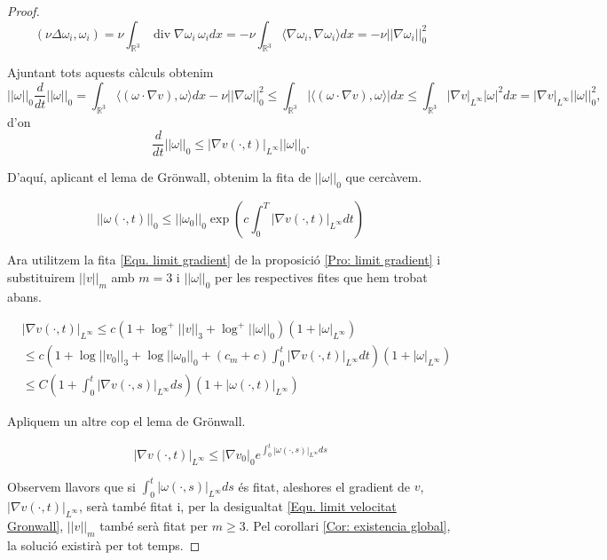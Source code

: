 \documentclass{article}
\numberwithin{equation}{section}
\DeclareMathOperator{\diver}{div}
\begin{document}
\begin{proof}
\[(\nu\Delta\omega_i,\omega_i)=\nu\int_{\mathbb{R}^3}\diver\nabla\omega_i\,\omega_idx=-\nu\int_{\mathbb{R}^3}\langle\nabla\omega_i,\nabla\omega_i\rangle dx=-\nu||\nabla\omega_i||_0^2\]

Ajuntant tots aquests c\`{a}lculs obtenim
\[||\omega||_0\frac{d}{dt}||\omega||_0=\int_{\mathbb{R}^3}\langle(\omega\cdot\nabla v),\omega\rangle dx-\nu||\nabla\omega||_0^2\leq\int_{\mathbb{R}^3}|\langle(\omega\cdot\nabla v),\omega\rangle|dx\leq\int_{\mathbb{R}^3}|\nabla v|_{L^{\infty}}|\omega|^2dx=|\nabla v|_{L^{\infty}}||\omega||_0^2,\]
d'on
\[\frac{d}{dt}||\omega||_0\leq|\nabla v(\cdot,t)|_{L^{\infty}}||\omega||_0.\]

D'aqu\'{i}, aplicant el lema de Gr\"{o}nwall, obtenim la fita de $||\omega||_0$ que cerc\`{a}vem.

\[||\omega(\cdot,t)||_0\leq||\omega_0||_0\exp\left(c\int_0^T|\nabla v(\cdot,t)|_{L^{\infty}}dt\right)\]

Ara utilitzem la fita \eqref{Equ. limit gradient} de la proposici\'{o} \ref{Pro: limit gradient} i substituirem $||v||_m$ amb $m=3$ i $||\omega||_0$ per les respectives fites que hem trobat abans.

\begin{align*}
&|\nabla v(\cdot,t)|_{L^{\infty}}\leq c(1+\log^+||v||_3+\log^+||\omega||_0)(1+|\omega|_{L^{\infty}})\\
&\leq c\left(1+\log||v_0||_3+\log||\omega_0||_0+(c_m+c)\int_0^t|\nabla v(\cdot,t)|_{L^{\infty}}dt\right)(1+|\omega|_{L^{\infty}})\\
&\leq C\left(1+\int_0^t|\nabla v(\cdot,s)|_{L^{\infty}}ds\right)(1+|\omega(\cdot,t)|_{L^{\infty}})
\end{align*}

Apliquem un altre cop el lema de Gr\"{o}nwall.

\[|\nabla v(\cdot,t)|_{L^{\infty}}\leq|\nabla v_0|_0e^{\int_0^t|\omega(\cdot,s)|_{L^{\infty}}ds}\]

Observem llavors que si $\int_0^t|\omega(\cdot,s)|_{L^{\infty}}ds$ \'{e}s fitat, aleshores el gradient de $v$, $|\nabla v(\cdot,t)|_{L^{\infty}}$, ser\`{a} tamb\'{e} fitat i, per la desigualtat \eqref{Equ. limit velocitat Gronwall}, $||v||_m$ tamb\'{e} ser\`{a} fitat per $m\geq3$. Pel corol\textperiodcentered lari \ref{Cor: existencia global}, la soluci\'{o} existir\`{a} per tot temps.
\end{proof}
\end{document}

